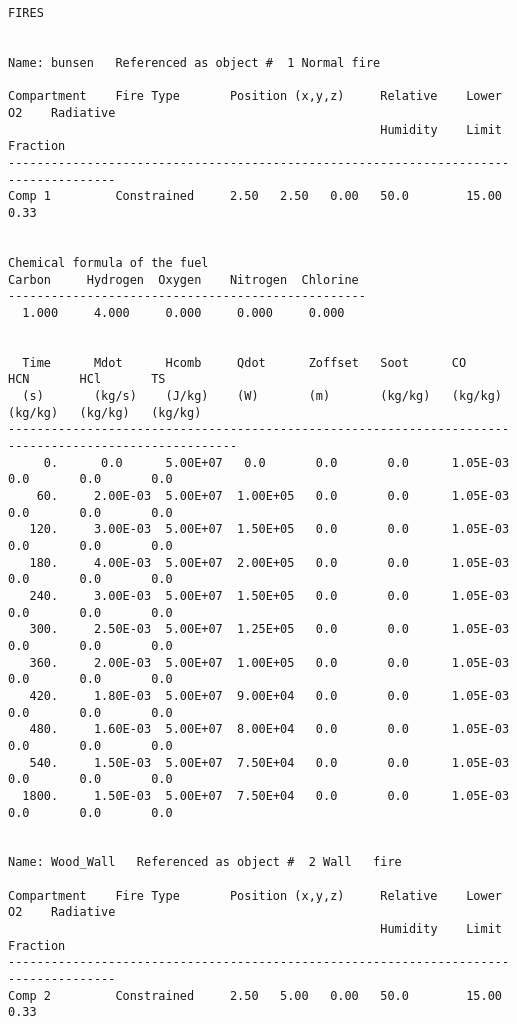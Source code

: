 \begin{lstlisting}[basicstyle=\tiny]
FIRES


Name: bunsen   Referenced as object #  1 Normal fire

Compartment    Fire Type       Position (x,y,z)     Relative    Lower O2    Radiative
                                                    Humidity    Limit       Fraction
-------------------------------------------------------------------------------------
Comp 1         Constrained     2.50   2.50   0.00   50.0        15.00        0.33


Chemical formula of the fuel
Carbon     Hydrogen  Oxygen    Nitrogen  Chlorine
--------------------------------------------------
  1.000     4.000     0.000     0.000     0.000


  Time      Mdot      Hcomb     Qdot      Zoffset   Soot      CO        HCN       HCl       TS
  (s)       (kg/s)    (J/kg)    (W)       (m)       (kg/kg)   (kg/kg)   (kg/kg)   (kg/kg)   (kg/kg)
------------------------------------------------------------------------------------------------------
     0.      0.0      5.00E+07   0.0       0.0       0.0      1.05E-03   0.0       0.0       0.0
    60.     2.00E-03  5.00E+07  1.00E+05   0.0       0.0      1.05E-03   0.0       0.0       0.0
   120.     3.00E-03  5.00E+07  1.50E+05   0.0       0.0      1.05E-03   0.0       0.0       0.0
   180.     4.00E-03  5.00E+07  2.00E+05   0.0       0.0      1.05E-03   0.0       0.0       0.0
   240.     3.00E-03  5.00E+07  1.50E+05   0.0       0.0      1.05E-03   0.0       0.0       0.0
   300.     2.50E-03  5.00E+07  1.25E+05   0.0       0.0      1.05E-03   0.0       0.0       0.0
   360.     2.00E-03  5.00E+07  1.00E+05   0.0       0.0      1.05E-03   0.0       0.0       0.0
   420.     1.80E-03  5.00E+07  9.00E+04   0.0       0.0      1.05E-03   0.0       0.0       0.0
   480.     1.60E-03  5.00E+07  8.00E+04   0.0       0.0      1.05E-03   0.0       0.0       0.0
   540.     1.50E-03  5.00E+07  7.50E+04   0.0       0.0      1.05E-03   0.0       0.0       0.0
  1800.     1.50E-03  5.00E+07  7.50E+04   0.0       0.0      1.05E-03   0.0       0.0       0.0


Name: Wood_Wall   Referenced as object #  2 Wall   fire

Compartment    Fire Type       Position (x,y,z)     Relative    Lower O2    Radiative
                                                    Humidity    Limit       Fraction
-------------------------------------------------------------------------------------
Comp 2         Constrained     2.50   5.00   0.00   50.0        15.00        0.33



\end{lstlisting}
